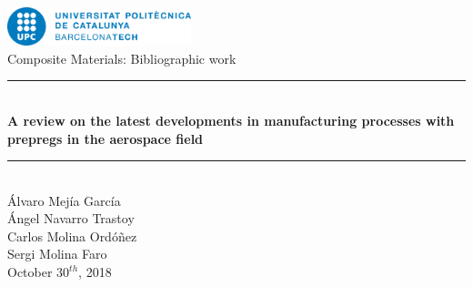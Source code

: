 
\begin{titlepage}

\newcommand{\HRule}{\rule{\linewidth}{0.5mm}} %

\center %


\includegraphics[width=0.4\textwidth]{img/UPC_logo.jpg}\\[2.4cm]
\large Composite Materials: Bibliographic work\\[0.2cm]

\HRule \\[0.2cm]
{ \Large \bfseries
A review on the latest developments
in manufacturing processes with
prepregs in the aerospace field\\
}
\HRule \\[1.5cm]

{ \normalsize Álvaro Mejía García\\Ángel Navarro Trastoy\\
Carlos Molina Ordóñez\\Sergi Molina Faro} \\[1cm]

{\normalsize October $30^{th}$, 2018}\\[6cm] %




\vfill %

\end{titlepage}
